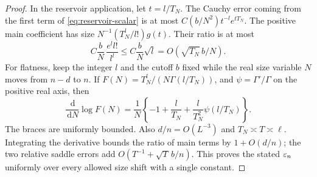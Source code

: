 \documentclass[11pt]{article}
\theoremstyle{definition}\newtheorem{definition}[theorem]{Definition}
\theoremstyle{remark}\newtheorem{remark}[theorem]{Remark}
\newcommand{\dd}{\,\mathrm d}\newcommand{\ind}{\mathbf1}
\numberwithin{equation}{section}\allowdisplaybreaks
\begin{document}
\begin{proof}
In the reservoir application, let $t=l/T_N$. The Cauchy error coming
from the first term of \eqref{eq:reservoir-scalar} is at most
$C(b/N^2)t^{-l}e^{tT_N}$. The positive main coefficient has size
$N^{-1}(T_N^l/l!)g(t)$. Their ratio is at most
\[
 C\frac bN\,\frac{e^l l!}{l^l}
 \le C\frac bN\sqrt l=O\!\left(\sqrt{T_N}\,b/N\right).
\]
For flatness, keep the integer $l$ and the cutoff $b$ fixed while the
real size variable $N$ moves from $n-d$ to $n$. If
$F(N)=T_N^l/(N\Gamma(l/T_N))$, and
$\psi=\Gamma'/\Gamma$ on the positive real axis, then
\[
 \frac{\dd}{\dd N}\log F(N)
 =\frac1N\left\{-1+\frac l{T_N}
            +\frac l{T_N^2}\psi(l/T_N)\right\}.
\]
The braces are uniformly bounded. Also $d/n=O(L^{-3})$ and
$T_N\asymp T\asymp\ell$. Integrating the derivative bounds the ratio
of main terms by $1+O(d/n)$; the two relative saddle errors add
$O(T^{-1}+\sqrt T\,b/n)$. This proves the stated $\varepsilon_n$ uniformly
over every allowed size shift with a single constant.

\end{proof}
\end{document}
